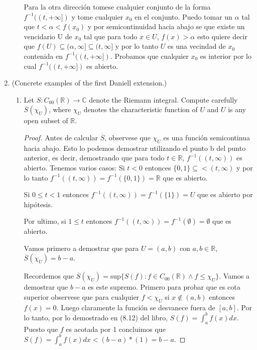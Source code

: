 \documentclass[letter,twoside,12pt]{article}
\begin{document}
\begin{enumerate}
\begin{enumerate}
Para la otra dirección tomese cualquier conjunto de la forma $ f^{-1}((t,+\infty]) $ y tome cualquier $x_0$ en el conjunto. Puedo tomar un $\alpha $ tal que $t<\alpha < f(x_0)$ y por semicontinuidad hacia abajo se que existe un vencidario U de $x_0 $ tal que para todo $x \in U $, $f(x)>\alpha $ esto quiere decir que $f(U) \subseteq (\alpha, \infty ] \subseteq (t, \infty] $ y por lo tanto $U $ es una vecindad de $x_0$ contenida en $ f^{-1}((t,+\infty]) $. Probamos que cualquier $x_0 $ es interior por lo cual $ f^{-1}((t,+\infty]) $ es abierto.

\end{enumerate} 

\item (Concrete examples of the first Daniell extension.)
\begin{enumerate} \item Let $S : C_{00}(\mathbb{R}) \rightarrow \mathbb{C} $ denote the Riemann integral. Compute carefully $\overline{S}(\chi_U )$, where $\chi_U$
denotes the characteristic function of $U$ and $U$ is any open subset of $\mathbb{R}$.

\begin{proof}

Antes de calcular $\overline{S}$, observese que $\chi_U$ es una función semicontinua hacia abajo. Esto lo podemos demostrar utilizando el punto b del punto anterior, es decir, demostrando que para todo $t \in \mathbb{R}$, $f^{-1}((t,\infty))$ es abierto. Tenemos varios casos: Si $t<0$ entonces   $\{0,1\} \subseteq < (t,\infty) $ y por lo tanto $f^{-1}((t,\infty)) = f^{-1}(\{0,1\}) = \mathbb{R} $ que es abierto.

Si $0\leq t< 1$ entonces $f^{-1}((t,\infty)) = f^{-1}(\{1\}) = U  $ que es abierto por hipótesis.

Por ultimo, si $1 \leq t $ entonces $f^{-1}((t,\infty)) = f^{-1}(\emptyset) = \emptyset  $ que es abierto.



Vamos primero a demostrar que para $U = (a,b)$ con $a,b \in \mathbb{R} $, $ \overline{S}(\chi_U) = b-a $.

Recordemos que $\overline{S}(\chi_U) = \text{sup}\{S(f): f \in C_{00}(\mathbb{R}) \wedge f \leq \chi_U\} $. Vamos a demostrar que $ b - a$ es este supremo. Primero para probar que es cota superior observese que para cualquier $f<\chi_U$ si $x \not  \in (a,b)$ entonces $f(x)=0$. Luego claramente la función se desvanece fuera de $[a,b]$. Por lo tanto, por lo demostrado en (8.12) del libro, $S(f) = \int_a^b f(x)dx $. Puesto que $f$ es acotada por 1 concluimos que $S(f) = \int_a^b f(x)dx < (b-a)*(1) = b-a $.


\end{proof}
\end{enumerate}
\end{enumerate}
\end{document}
